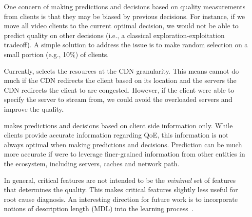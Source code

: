 One concern of making predictions and decisions 
based on quality measurements from clients is that 
they may be biased by previous decisions. 
For instance, if we move all video clients to the 
current optimal decision, we would not be able to 
predict quality on other decisions (i.e., a classical 
exploration-exploitation tradeoff).
A simple solution to address the issue is to make 
random selection on a small portion (e.g., 10\%) 
of clients.


Currently, \dda selects the resources at the CDN 
granularity. This means \dda cannot do much if the 
CDN redirects the client based on its location and 
the servers the CDN redirects the client to are 
congested. 
However, if the client were able to specify the 
server to stream from, we could avoid the 
overloaded servers and improve the quality.
	
\dda makes predictions and decisions based on  client 
side information only. While clients provide accurate 
information regarding QoE, this information is not 
always optimal when making predictions and decisions. 
Prediction can be much more accurate if \dda 
were to leverage finer-grained information from other 
entities in the ecosystem, including servers, caches 
and network path.

 In general, 
critical features are not intended to be the  {\em minimal} 
set of features that determines the quality.  
This makes critical  features slightly less useful for root 
cause diagnosis. An interesting direction for  future work 
is to incorporate notions of description length (MDL) 
into the learning process~\cite{mdl}.


